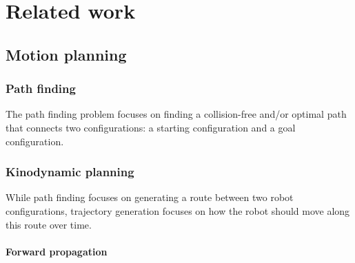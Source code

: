 \chapter{Related work}\label{chap:related_work}

\section{Motion planning}

\subsection{Path finding}

The path finding problem focuses on finding a collision-free and/or optimal path that connects two configurations: a starting configuration and a goal configuration.

\subsection{Kinodynamic planning}

While path finding focuses on generating a route between two robot configurations, trajectory generation focuses on how the robot should move along this route over time.

\subsubsection{}

\subsubsection{Forward propagation}






